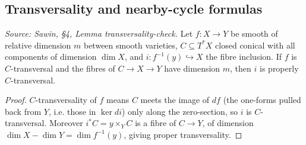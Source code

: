 \subsection{Transversality and nearby-cycle formulas}

\begin{lemma}
  \label{lem:sawin_transversality_check}
  \textit{Source: Sawin, §4, Lemma transversality-check.}
  Let $f:X\to Y$ be smooth of relative dimension $m$ between smooth varieties,
  $C\subseteq T^*X$ closed conical with all components of dimension $\dim X$, and
  $i:f^{-1}(y)\hookrightarrow X$ the fibre inclusion.  If $f$ is $C$-transversal
  and the fibres of $C\to X\to Y$ have dimension $m$, then $i$ is properly
  $C$-transversal.
\end{lemma}
\begin{proof}
  $C$-transversality of $f$ means $C$ meets the image of $df$ (the one-forms
  pulled back from $Y$, i.e. those in $\ker di$) only along the zero-section, so
  $i$ is $C$-transversal.  Moreover $i^*C = y\times_Y C$ is a fibre of $C\to Y$,
  of dimension $\dim X-\dim Y = \dim f^{-1}(y)$, giving proper transversality.
\end{proof}

